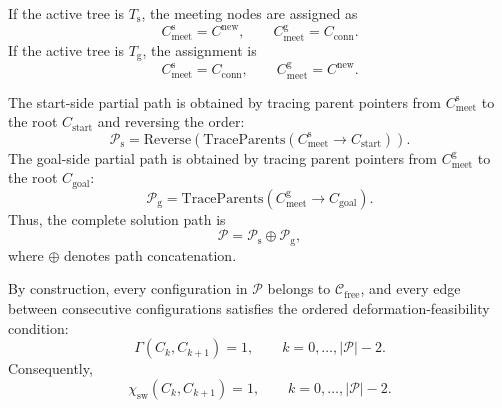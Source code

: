 \documentclass{pas}
\begin{document}
If the active tree is \(T_{\mathrm{s}}\), the meeting nodes are assigned as
\begin{equation}
C_{\mathrm{meet}}^{\mathrm{s}}
=
C^{\mathrm{new}},
\qquad
C_{\mathrm{meet}}^{\mathrm{g}}
=
C_{\mathrm{conn}}.
\label{eq:gcr_meeting_nodes_start_active}
\end{equation}
If the active tree is \(T_{\mathrm{g}}\), the assignment is
\begin{equation}
C_{\mathrm{meet}}^{\mathrm{s}}
=
C_{\mathrm{conn}},
\qquad
C_{\mathrm{meet}}^{\mathrm{g}}
=
C^{\mathrm{new}}.
\label{eq:gcr_meeting_nodes_goal_active}
\end{equation}

The start-side partial path is obtained by tracing parent pointers from
\(C_{\mathrm{meet}}^{\mathrm{s}}\) to the root \(C_{\mathrm{start}}\) and
reversing the order:
\begin{equation}
\mathcal{P}_{\mathrm{s}}
=
\mathrm{Reverse}
\left(
\mathrm{TraceParents}
\left(
C_{\mathrm{meet}}^{\mathrm{s}}
\rightarrow
C_{\mathrm{start}}
\right)
\right).
\label{eq:gcr_start_side_path}
\end{equation}
The goal-side partial path is obtained by tracing parent pointers from
\(C_{\mathrm{meet}}^{\mathrm{g}}\) to the root \(C_{\mathrm{goal}}\):
\begin{equation}
\mathcal{P}_{\mathrm{g}}
=
\mathrm{TraceParents}
\left(
C_{\mathrm{meet}}^{\mathrm{g}}
\rightarrow
C_{\mathrm{goal}}
\right).
\label{eq:gcr_goal_side_path}
\end{equation}
Thus, the complete solution path is
\begin{equation}
\mathcal{P}
=
\mathcal{P}_{\mathrm{s}}
\oplus
\mathcal{P}_{\mathrm{g}},
\label{eq:gcr_complete_path_concatenation}
\end{equation}
where \(\oplus\) denotes path concatenation.

By construction, every configuration in \(\mathcal{P}\) belongs to
\(\mathcal{C}_{\mathrm{free}}\), and every edge between consecutive
configurations satisfies the ordered deformation-feasibility condition:
\begin{equation}
\Gamma(C_k,C_{k+1})=1,
\qquad
k=0,\ldots,|\mathcal{P}|-2.
\label{eq:gcr_complete_path_ordered_feasibility}
\end{equation}
Consequently,
\begin{equation}
\chi_{\mathrm{sw}}(C_k,C_{k+1})=1,
\qquad
k=0,\ldots,|\mathcal{P}|-2.
\label{eq:gcr_complete_path_swept_clear_feasibility}
\end{equation}
\end{document}
